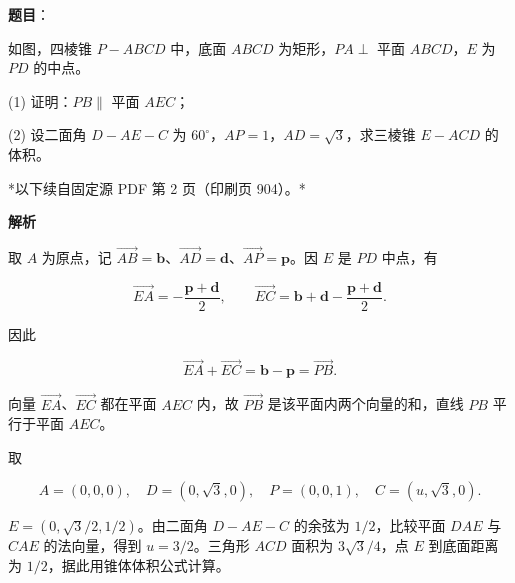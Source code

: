\begin{answer}

\textbf{题目}：

如图，四棱锥 $P-ABCD$ 中，底面 $ABCD$ 为矩形，$PA\perp$ 平面 $ABCD$，$E$ 为 $PD$ 的中点。
\nopagebreak[4]
\begin{center}\end{center}
\nopagebreak[4]
(1) 证明：$PB\parallel$ 平面 $AEC$；

(2) 设二面角 $D-AE-C$ 为 $60^\circ$，$AP=1$，$AD=\sqrt3$，求三棱锥 $E-ACD$ 的体积。

\par\medskip

*以下续自固定源 PDF 第 2 页（印刷页 904）。*

\textbf{解析}


取 $A$ 为原点，记 $\overrightarrow{AB}=\boldsymbol b$、$\overrightarrow{AD}=\boldsymbol d$、$\overrightarrow{AP}=\boldsymbol p$。因 $E$ 是 $PD$ 中点，有

\nopagebreak[4]
\[
\overrightarrow{EA}=-\frac{\boldsymbol p+\boldsymbol d}{2},\qquad
\overrightarrow{EC}=\boldsymbol b+\boldsymbol d-\frac{\boldsymbol p+\boldsymbol d}{2}.
\]

因此

\nopagebreak[4]
\[
\overrightarrow{EA}+\overrightarrow{EC}=\boldsymbol b-\boldsymbol p=\overrightarrow{PB}.
\]

向量 $\overrightarrow{EA}$、$\overrightarrow{EC}$ 都在平面 $AEC$ 内，故 $\overrightarrow{PB}$ 是该平面内两个向量的和，直线 $PB$ 平行于平面 $AEC$。


取

\nopagebreak[4]
\[
A=(0,0,0),\quad D=(0,\sqrt3,0),\quad P=(0,0,1),\quad C=(u,\sqrt3,0).
\]

$E=(0,\sqrt3/2,1/2)$。由二面角 $D-AE-C$ 的余弦为 $1/2$，比较平面 $DAE$ 与 $CAE$ 的法向量，得到 $u=3/2$。三角形 $ACD$ 面积为 $3\sqrt3/4$，点 $E$ 到底面距离为 $1/2$，据此用锥体体积公式计算。



\end{answer}
